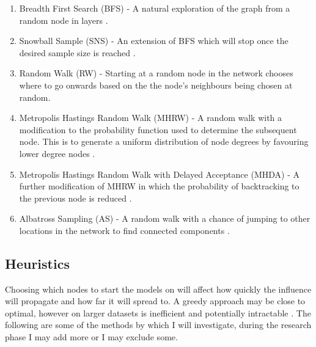 \documentclass{article}
\begin{document}
\begin{enumerate}
	\item Breadth First Search (BFS) - A natural exploration of the graph from a random node in layers \cite{franks2014learning}.
	\item Snowball Sample (SNS) - An extension of BFS which will stop once the desired sample size is reached \cite{franks2014learning}.
	\item Random Walk (RW) - Starting at a random node in the network chooses where to go onwards based on the the node's neighbours being chosen at random.
	\item Metropolis Hastings Random Walk (MHRW) - A random walk with a modification to the probability function used to determine the subsequent node. This is to generate a uniform distribution of node degrees by favouring lower degree nodes \cite{gjoka11practicalreco}.
	\item Metropolis Hastings Random Walk with Delayed Acceptance (MHDA) - A further modification of MHRW in which the probability of backtracking to the previous node is reduced \cite{lee2012randomwalkmetropolishastingssamplers}.
	\item Albatross Sampling (AS) - A random walk with a chance of jumping to other locations in the network to find connected components \cite{jin2011albatross}.
\end{enumerate}

\subsection{Heuristics}

Choosing which nodes to start the models on will affect how quickly the influence will propagate and how far it will spread to.
A greedy approach may be close to optimal, however on larger datasets is inefficient and potentially intractable \cite{griffiths17LimitiingConcept}.
The following are some of the methods by which I will investigate, during the research phase I may add more or I may exclude some.
\end{document}
